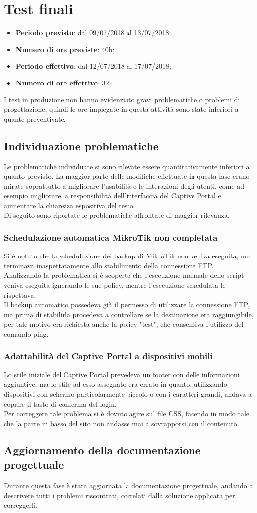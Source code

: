 \documentclass[Realizzazione.tex]{subfiles}
\begin{document}
\section{Test finali	}
\begin{itemize}
	\item \textbf{Periodo previsto}: dal 09/07/2018 al 13/07/2018;
	\item \textbf{Numero di ore previste}: 40h;
	\item \textbf{Periodo effettivo}: dal 12/07/2018 al 17/07/2018;
	\item \textbf{Numero di ore effettive}: 32h.
\end{itemize}
I test in produzione non hanno evidenziato gravi problematiche o problemi di progettazione, quindi le ore impiegate in questa attività sono state inferiori a quante preventivate.

\subsection{Individuazione problematiche}
Le problematiche individuate si sono rilevate essere quantitativamente inferiori a quanto previsto. La maggior parte delle modifiche effettuate in questa fase erano mirate soprattutto a migliorare l'usabilità e le interazioni degli utenti, come ad esempio migliorare la responsibilità dell'interfaccia del Captive Portal e aumentare la chiarezza espositiva del testo.\\
Di seguito sono riportate le problematiche affrontate di maggior rilevanza.

\subsubsection{Schedulazione automatica MikroTik non completata}
Si è notato che la schedulazione dei backup di MikroTik non veniva eseguita, ma terminava inaspettatamente allo stabilimento della connessione FTP. \\
Analizzando la problematica si è scoperto che l'esecuzione manuale dello script veniva eseguita ignorando le sue policy, mentre l'esecuzione schedulata le rispettava.\\
Il backup automatico possedeva già il permesso di utilizzare la connessione FTP, ma prima di stabilirla procedeva a controllare se la destinazione era raggiungibile, per tale motivo era richiesta anche la policy "test", che consentiva l'utilizzo del comando ping.

\subsubsection{Adattabilità del Captive Portal a dispositivi mobili}
Lo stile iniziale del Captive Portal prevedeva un footer con delle informazioni aggiuntive, ma lo stile ad esso assegnato era errato in quanto, utilizzando dispositivi con schermo particolarmente piccolo o con i caratteri grandi, andava a coprire il tasto di conferma del login. \\
Per correggere tale problema si è dovuto agire sul file CSS, facendo in modo tale che la parte in basso del sito non andasse mai a sovrapporsi con il contenuto.

\subsection{Aggiornamento della documentazione progettuale}
Durante questa fase è stata aggiornata la documentazione progettuale, andando a descrivere tutti i problemi riscontrati, correlati dalla soluzione applicata per correggerli.
\end{document}
